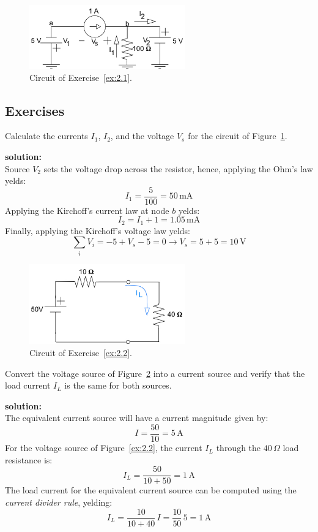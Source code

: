\begin{figure}[h!]
  \centering
  \includegraphics[width=0.6\textwidth]{"images/Fig-15"}
  \caption{Circuit of Exercise~\ref{ex:2.1}.} 
  \label{Fig:Ex:2.1}
\end{figure}

\subsection*{Exercises}
\begin{exercise}
\label{ex:2.1}
Calculate the currents $I_1$, $I_2$, and the voltage $V_s$ for the circuit of Figure~\ref{Fig:Ex:2.1}.

\textbf{solution:}\\
Source $V_2$ sets the voltage drop across the resistor, hence, applying the Ohm's law yelds:
\[I_1=\frac{5}{100}= 50\,\textrm{mA}\]
Applying the Kirchoff's current law at node $b$ yelds:
\[I_2 = I_1 + 1 = 1.05\,\textrm{mA}\]
Finally, applying the Kirchoff's voltage law yelds:
\[\sum_i V_i = -5 + V_s - 5 = 0 \longrightarrow V_s = 5 + 5 = 10\,\textrm{V}\]
\end{exercise} 

\begin{figure}[h!]
  \centering
  \includegraphics[width=0.6\textwidth]{"images/Fig-16"}
  \caption{Circuit of Exercise~\ref{ex:2.2}.} 
  \label{Fig:Ex:2.2}
\end{figure}

\begin{exercise}
\label{ex:2.2}
Convert the voltage source of Figure~\ref{Fig:Ex:2.2} into a current source and verify that the load current $I_L$ is the same for both sources.

\textbf{solution:}\\
The equivalent current source will have a current magnitude given by:
\[I = \frac{50}{10} = 5\,\textrm{A}\] 
For the voltage source of Figure~\ref{ex:2.2}, the current $I_L$ through the $40\,\Omega$ load resistance is:
\[I_L = \frac{50}{10 + 50} =1\,\textrm{A}\]
The load current for the equivalent current source can be computed using the \emph{current divider rule}, yelding:
\[I_L=\frac{10}{10 + 40}\,I = \frac{10}{50}\,5= 1\,\textrm{A}\]
\end{exercise}


